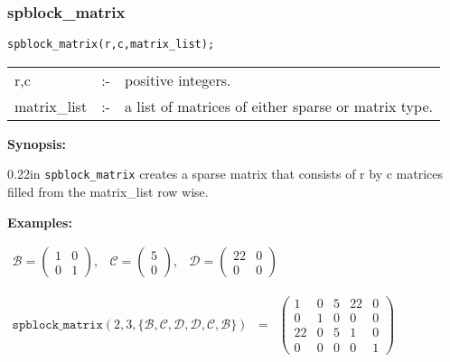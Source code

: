 \subsubsection{spblock\_matrix}

\hspace*{0.175in} \texttt{spblock\_matrix(r,c,matrix\_list);}

\hspace*{0.1in}
\begin{tabular}{l l l}
r,c          &:-& positive integers. \\
matrix\_list &:-& a list of matrices of either sparse or matrix type. 
\end{tabular}

\textbf{Synopsis:}

\begin{addtolength}{\leftskip}{0.22in}
\texttt{spblock\_matrix} creates a sparse matrix that consists of r by c matrices 
filled from the matrix\_list row wise.

\end{addtolength}


\textbf{Examples:}

\begin{flushleft}  
\hspace*{0.1in}
\begin{math}  
\begin{array}{ccc}
\mathcal{B} = \left( \begin{array}{cc} 1 & 0 \\ 0 & 1
\end{array} \right), & 
\mathcal{C} = \left( \begin{array}{c} 5 \\ 0
\end{array} \right), &
\mathcal{D} = \left( \begin{array}{cc} 22 & 0 \\ 0 & 0
\end{array} \right) 
\end{array}
\end{math}  
\end{flushleft}

\vspace*{0.175in}

\begin{flushleft}  
\hspace*{0.1in}
\begin{math}  
\begin{array}{ccc}
\texttt{spblock\_matrix}(2,3,\{\mathcal{B,C,D,D,C,B}\}) & = & 
\left( \begin{array}{ccccc} 1 & 0 & 5 & 22 & 0 \\ 0 & 1 & 0 & 0 & 0 
\\
22 & 0 & 5 & 1 & 0 \\ 0 & 0 & 0 & 0 & 1
\end{array} \right)  
\end{array}  
\end{math}  
\end{flushleft}


